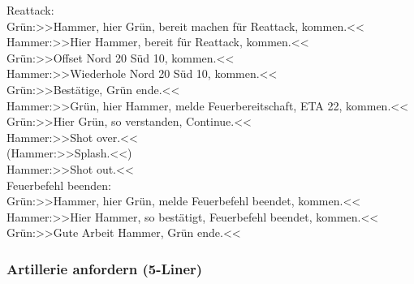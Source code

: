 	Reattack:  \\
	 Grün:>>Hammer, hier Grün, bereit machen für Reattack, kommen.<<  \\
	 Hammer:>>Hier Hammer, bereit für Reattack, kommen.<< \\
	 Grün:>>Offset Nord 20 Süd 10, kommen.<< \\
	 Hammer:>>Wiederhole Nord 20 Süd 10, kommen.<< \\
	 Grün:>>Bestätige, Grün ende.<< \\
	 Hammer:>>Grün, hier Hammer, melde Feuerbereitschaft, ETA 22, kommen.<< \\
	 Grün:>>Hier Grün, so verstanden, Continue.<< \\
	 Hammer:>>Shot over.<< \\
	 (Hammer:>>Splash.<<) \\
	 Hammer:>>Shot out.<< \\

	Feuerbefehl beenden: \\

	 Grün:>>Hammer, hier Grün, melde Feuerbefehl beendet, kommen.<< \\
	 Hammer:>>Hier Hammer, so bestätigt, Feuerbefehl beendet, kommen.<< \\
	 Grün:>>Gute Arbeit Hammer, Grün ende.<< \\



\subsubsection{Artillerie anfordern (5-Liner)}
